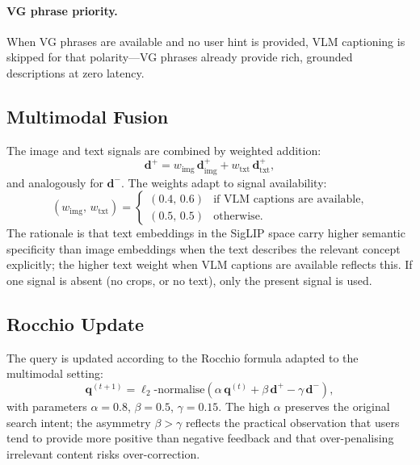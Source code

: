 \documentclass[12pt,a4paper]{article}
\newcommand{\vq}{\bm{q}}
\newcommand{\vd}{\bm{d}}
\begin{document}
\paragraph{VG phrase priority.}
When VG phrases are available and no user hint is provided, VLM captioning
is skipped for that polarity—VG phrases already provide rich, grounded
descriptions at zero latency.

\subsection{Multimodal Fusion}

The image and text signals are combined by weighted addition:
\begin{equation}
  \vd^+ = w_{\text{img}}\,\vd^+_{\text{img}} + w_{\text{txt}}\,\vd^+_{\text{txt}},
  \label{eq:fusion}
\end{equation}
and analogously for $\vd^-$. The weights adapt to signal availability:
\begin{equation}
  (w_{\text{img}},\, w_{\text{txt}}) =
  \begin{cases}
    (0.4,\, 0.6) & \text{if VLM captions are available,} \\
    (0.5,\, 0.5) & \text{otherwise.}
  \end{cases}
\end{equation}
The rationale is that text embeddings in the SigLIP space carry higher
semantic specificity than image embeddings when the text describes the
relevant concept explicitly; the higher text weight when VLM captions are
available reflects this.
If one signal is absent (no crops, or no text), only the present signal is used.

\subsection{Rocchio Update}

The query is updated according to the Rocchio formula adapted to the
multimodal setting:
\begin{equation}
  \vq^{(t+1)} = \ell_2\text{-normalise}\!\left(
    \alpha\,\vq^{(t)} + \beta\,\vd^+ - \gamma\,\vd^-
  \right),
  \label{eq:rocchio}
\end{equation}
with parameters $\alpha = 0.8$, $\beta = 0.5$, $\gamma = 0.15$.
The high $\alpha$ preserves the original search intent; the asymmetry
$\beta > \gamma$ reflects the practical observation that users tend to provide
more positive than negative feedback and that over-penalising irrelevant
content risks over-correction.
\end{document}
